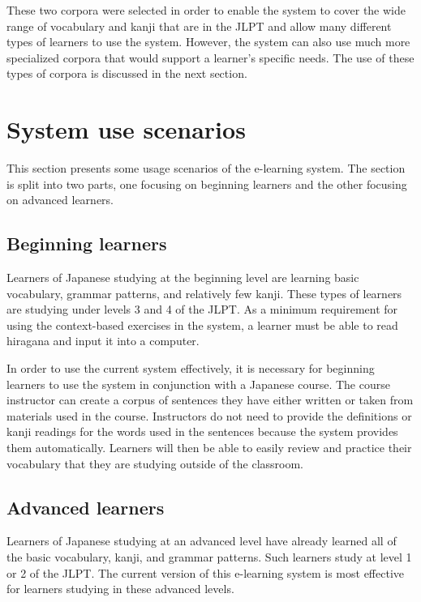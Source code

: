 \documentclass[english]{jnlp_1.4}
\begin{document}
These two corpora were selected in order to enable the system to cover the wide range of vocabulary and kanji that are in the JLPT and allow many different types of learners to use the system. However, the system can also use much more specialized corpora that would support a learner's specific needs. The use of these types of corpora is discussed in the next section.



\section{System use scenarios}

This section presents some usage scenarios of the e-learning system. The section is split into two parts, one focusing on beginning learners and the other focusing on advanced learners.


\subsection{Beginning learners}

Learners of Japanese studying at the beginning level are learning basic vocabulary, grammar patterns, and relatively few kanji. These types of learners are studying under levels 3 and 4 of the JLPT. As a minimum requirement for using the context-based exercises in the system, a learner must be able to read hiragana and input it into a computer.

In order to use the current system effectively, it is necessary for beginning learners to use the system in conjunction with a Japanese course. The course instructor can create a corpus of sentences they have either written or taken from materials used in the course. Instructors do not need to provide the definitions or kanji readings for the words used in the sentences because the system provides them automatically. Learners will then be able to easily review and practice their vocabulary that they are studying outside of the classroom.


\subsection{Advanced learners}

Learners of Japanese studying at an advanced level have already learned all of the basic vocabulary, kanji, and grammar patterns. Such learners study at level 1 or 2 of the JLPT. The current version of this e-learning system is most effective for learners studying in these advanced levels.
\end{document}
